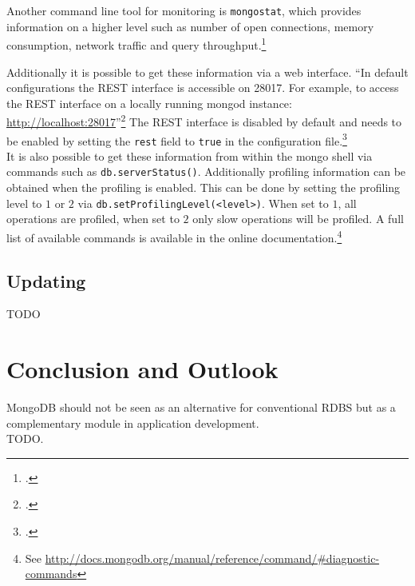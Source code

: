Another command line tool for monitoring is \texttt{mongostat}, which provides
information on a higher level such as number of open connections,
memory consumption, network traffic and query throughput.\footcite[Cf.][]{mongo_monitoring}

Additionally it is possible to get these information via a web interface.
``In default configurations the REST interface is accessible on 28017. For
example, to access the REST interface on a locally running mongod instance:
\url{http://localhost:28017}''\footcite[][]{mongo_monitoring}
The REST interface is disabled by default and needs to be enabled by setting the
\texttt{rest} field to \texttt{true} in the configuration file.\footcite[Cf.][]{mongo_conf}\\
It is also possible to get these information from within the mongo shell via commands such as
\texttt{db.serverStatus()}. Additionally profiling information can be obtained when the
profiling is enabled. This can be done by setting the profiling level to $1$ or $2$ via
\texttt{db.setProfilingLevel(<level>)}. When set to $1$, all operations are profiled, when set
to $2$ only slow operations will be profiled.
A full list of available commands is available in the online
documentation.\footnote{See \url{http://docs.mongodb.org/manual/reference/command/\#diagnostic-commands}}

\subsection{Updating}
\label{sec:maintenance-updating}
TODO




\newpage
\section{Conclusion and Outlook}
\label{sec:conclusion}

MongoDB should not be seen as an alternative for conventional RDBS but as a
complementary module in application development.\\
TODO.



